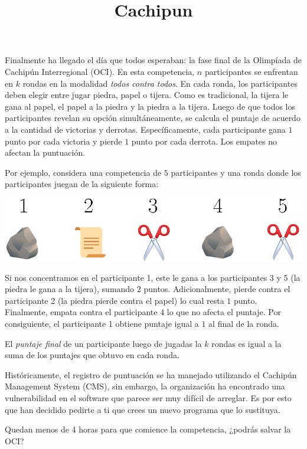 \documentclass{oci}
\title{Cachipun}
\begin{document}
\begin{problemDescription}
  Finalmente ha llegado el día que todos esperaban:
  la fase final de la Olimpíada de Cachipún Interregional (OCI).
  En esta competencia, $n$ participantes se enfrentan en $k$ rondas
  en la modalidad \emph{todos contra todos}.
  En cada ronda, los participantes deben elegir entre jugar piedra, papel o tijera.
  Como es tradicional, la tijera le gana al papel, el papel a la piedra y la piedra a
  la tijera.
  Luego de que todos los participantes revelan su opción simultáneamente, se
  calcula el puntaje de acuerdo a la cantidad de victorias y derrotas.
  Específicamente, cada participante gana $1$ punto por cada victoria
  y pierde $1$ punto por cada derrota.
  Los empates no afectan la puntuación.

  Por ejemplo, considera una competencia de $5$ participantes y una ronda donde
  los participantes juegan de la siguiente forma:
  \begin{center}
    \includegraphics[scale=0.8]{ronda.eps}
  \end{center}
  Si nos concentramos en el participante 1, este le gana a los participantes 3 y 5
  (la piedra le gana a la tijera), sumando $2$ puntos.
  Adicionalmente, pierde contra el participante 2 (la piedra pierde contra el papel)
  lo cual resta $1$ punto.
  Finalmente, empata contra el participante 4 lo que no afecta el puntaje.
  Por consiguiente, el participante 1 obtiene puntaje igual a $1$ al final de la ronda.

  El \emph{puntaje final} de un participante luego de jugadas la $k$ rondas
  es igual a la suma de los puntajes que obtuvo en cada ronda.

  Históricamente, el registro de puntuación se ha manejado utilizando el
  Cachipún Management System (CMS), sin embargo, la organización ha encontrado
  una vulnerabilidad en el software que parece ser muy difícil de arreglar.
  Es por esto que han decidido pedirte a ti que crees un nuevo programa que lo
  sustituya.

  Quedan menos de 4 horas para que comience la competencia, ¿podrás salvar la OCI?
\end{problemDescription}
\end{document}
